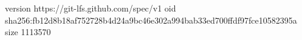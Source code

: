 version https://git-lfs.github.com/spec/v1
oid sha256:fb12d8b18af752728b4d24a9bc46e302a994bab33ed700ffdf97fce10582395a
size 1113570
